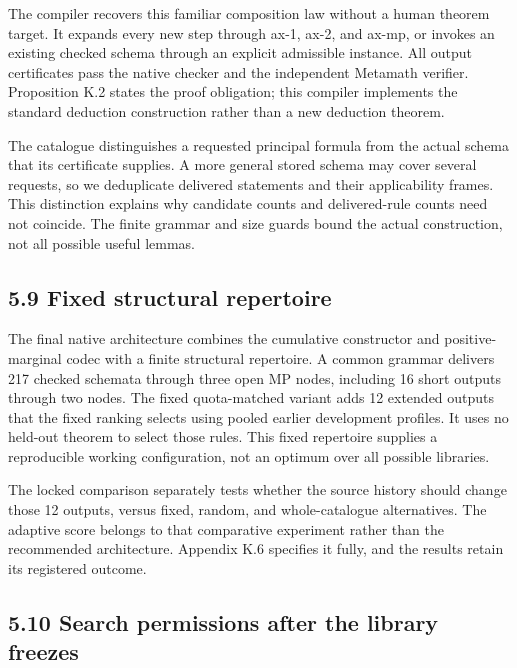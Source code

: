 \documentclass[pdflatex,sn-basic,Numbered]{sn-jnl}
\begin{document}
The compiler recovers this familiar composition law without a human theorem target. It expands every new step through ax-1, ax-2, and ax-mp, or invokes an existing checked schema through an explicit admissible instance. All output certificates pass the native checker and the independent Metamath verifier. Proposition K.2 states the proof obligation; this compiler implements the standard deduction construction rather than a new deduction theorem.

The catalogue distinguishes a requested principal formula from the actual schema that its certificate supplies. A more general stored schema may cover several requests, so we deduplicate delivered statements and their applicability frames. This distinction explains why candidate counts and delivered-rule counts need not coincide. The finite grammar and size guards bound the actual construction, not all possible useful lemmas.

\subsection*{5.9 Fixed structural repertoire}\label{fixed-structural-repertoire}

The final native architecture combines the cumulative constructor and positive-marginal codec with a finite structural repertoire. A common grammar delivers 217 checked schemata through three open MP nodes, including 16 short outputs through two nodes. The fixed quota-matched variant adds 12 extended outputs that the fixed ranking selects using pooled earlier development profiles. It uses no held-out theorem to select those rules. This fixed repertoire supplies a reproducible working configuration, not an optimum over all possible libraries.

The locked comparison separately tests whether the source history should change those 12 outputs, versus fixed, random, and whole-catalogue alternatives. The adaptive score belongs to that comparative experiment rather than the recommended architecture. Appendix K.6 specifies it fully, and the results retain its registered outcome.

\subsection*{5.10 Search permissions after the library freezes}\label{search-permissions-after-the-library-freezes}
\end{document}
